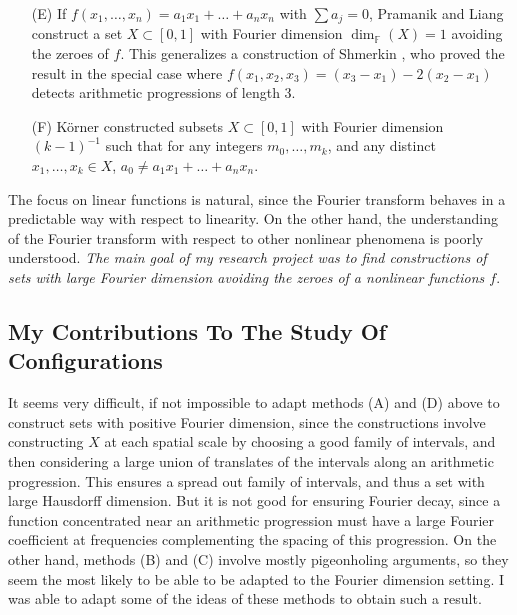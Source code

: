 \documentclass[11pt]{article}
\begin{document}
%
\begin{itemize}
	\item[(E)] If $f(x_1,\dots,x_n) = a_1x_1 + \dots + a_nx_n$ with $\sum a_j = 0$, Pramanik and Liang \cite{PramanikLiang} construct a set $X \subset [0,1]$ with Fourier dimension $\dim_{\mathbb{F}}(X) = 1$ avoiding the zeroes of $f$. This generalizes a construction of Shmerkin \cite{Shmerkin}, who proved the result in the special case where $f(x_1,x_2,x_3) = (x_3 - x_1) - 2 (x_2 - x_1)$ detects arithmetic progressions of length 3.

	\item[(F)] K\"{o}rner constructed subsets $X \subset [0,1]$ with Fourier dimension $(k-1)^{-1}$ such that for any integers $m_0,\dots,m_k$, and any distinct $x_1,\dots,x_k \in X$, $a_0 \neq a_1x_1 + \dots + a_nx_n$.
\end{itemize}
%
The focus on linear functions is natural, since the Fourier transform behaves in a predictable way with respect to linearity. On the other hand, the understanding of the Fourier transform with respect to other nonlinear phenomena is poorly understood. \emph{The main goal of my research project was to find constructions of sets with large Fourier dimension avoiding the zeroes of a nonlinear functions $f$}.

\subsection{My Contributions To The Study Of Configurations} \label{MyContributionFractals}

It seems very difficult, if not impossible to adapt methods (A) and (D) above to construct sets with positive Fourier dimension, since the constructions involve constructing $X$ at each spatial scale by choosing a good family of intervals, and then considering a large union of translates of the intervals along an arithmetic progression. This ensures a spread out family of intervals, and thus a set with large Hausdorff dimension. But it is not good for ensuring Fourier decay, since a function concentrated near an arithmetic progression must have a large Fourier coefficient at frequencies complementing the spacing of this progression. On the other hand, methods (B) and (C) involve mostly pigeonholing arguments, so they seem the most likely to be able to be adapted to the Fourier dimension setting. I was able to adapt some of the ideas of these methods to obtain such a result.
\end{document}
